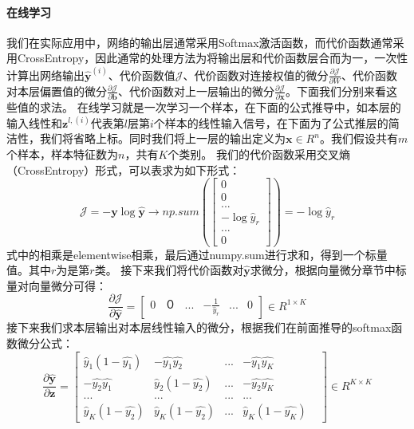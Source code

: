 \documentclass[UTF8]{article}
\begin{document}
\paragraph{在线学习}
我们在实际应用中，网络的输出层通常采用Softmax激活函数，而代价函数通常采用CrossEntropy，因此通常的处理方法为将输出层和代价函数层合而为一，一次性计算出网络输出$\hat{\boldsymbol{y}}^{(i)}$、代价函数值$\mathcal{J}$、代价函数对连接权值的微分$\frac{\partial{\mathcal{J}}}{\partial{W}}$、代价函数对本层偏置值的微分$\frac{\partial{\mathcal{J}}}{\partial{\boldsymbol{b}}}$、代价函数对上一层输出的微分$\frac{\partial{\mathcal{J}}}{\partial{\boldsymbol{x}}}$。下面我们分别来看这些值的求法。\newline
在线学习就是一次学习一个样本，在下面的公式推导中，如本层的输入线性和$\boldsymbol{z}^{l,(i)}$代表第$l$层第$i$个样本的线性输入信号，在下面为了公式推层的简洁性，我们将省略上标。同时我们将上一层的输出定义为$\boldsymbol{x} \in R^n$。我们假设共有$m$个样本，样本特征数为$n$，共有$K$个类别。\newline
我们的代价函数采用交叉熵（CrossEntropy）形式，可以表求为如下形式：
\begin{equation}
\mathcal{J}=-\boldsymbol{y} \log{\hat{\boldsymbol{y}}} \rightarrow np.sum(\begin{bmatrix}
0 \\
0 \\
... \\
-\log{\hat{y}_{r}} \\
... \\
0
\end{bmatrix})=-\log{\hat{y}_{r}}
\label{mlp-cross-entropy-vector-def}
\end{equation}
式中的相乘是elementwise相乘，最后通过numpy.sum进行求和，得到一个标量值。其中$r$为是第$r$类。\newline
接下来我们将代价函数对$\hat{\boldsymbol{y}}$求微分，根据向量微分章节中标量对向量微分可得：
\begin{equation}
\frac{\partial{\mathcal{J}}}{\partial{\hat{\boldsymbol{y}}}} = \begin{bmatrix}
0 & ０　& ... & -\frac{1}{\hat{y}_{r}} & ... & 0
\end{bmatrix} \in R^{1 \times K}
\label{mlp-pj-py-def}
\end{equation}
接下来我们求本层输出对本层线性输入的微分，根据我们在前面推导的softmax函数微分公式：
\begin{equation}
\frac{\partial{\hat{\boldsymbol{y}}}}{\partial{\boldsymbol{z}}}=\begin{bmatrix}
\hat{y}_{1}(1-\hat{y_{1}}) & -\hat{y_{1}}\hat{y_{2}} & ... & -\hat{y_{1}}\hat{y_{K}} \\
-\hat{y_{2}}\hat{y_{1}} & \hat{y}_{2}(1-\hat{y_{2}}) & ... & -\hat{y_{2}}\hat{y_{K}} \\
... & ... & ... &　... \\
\hat{y}_{K}(1-\hat{y_{2}}) & \hat{y}_{K}(1-\hat{y_{2}}) & ... & \hat{y}_{K}(1-\hat{y_{K}}) &
\end{bmatrix} \in R^{K \times K}
\label{mlp-py-pz-def}
\end{equation}
\end{document}
